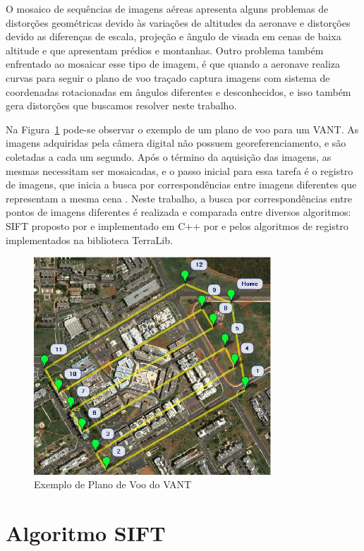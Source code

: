 \documentclass[9pt, a4paper, nofonttune, journal]{IEEEtran}
\begin{document}
O mosaico de sequências de imagens aéreas apresenta alguns problemas de distorções geométricas devido às variações de altitudes da aeronave e distorções devido as diferenças de escala, projeção e ângulo de visada em cenas de baixa altitude e que apresentam prédios e montanhas. Outro problema também enfrentado ao mosaicar esse tipo de imagem, é que quando a aeronave realiza curvas para seguir o plano de voo traçado captura imagens com sistema de coordenadas rotacionadas em ângulos diferentes e desconhecidos, e isso também gera distorções que buscamos resolver neste trabalho.

Na Figura~\ref{fig:plano_voo} pode-se observar o exemplo de um plano de voo para um VANT. As imagens adquiridas pela câmera digital não possuem georeferenciamento, e são coletadas a cada um segundo. Após o término da aquisição das imagens, as mesmas necessitam ser mosaicadas, e o passo inicial para essa tarefa é o registro de imagens, que inicia a busca por correspondências entre imagens diferentes que representam a mesma cena \cite{goltz1}. Neste trabalho, a busca por correspondências entre pontos de imagens diferentes é realizada e comparada entre diversos algoritmos: SIFT proposto por \cite{lowe} e implementado em C++ por \cite{vedaldi} e pelos algoritmos de registro implementados na biblioteca TerraLib.

\begin{figure}[h!t]
  \centering
  \includegraphics[width=3.5in]{figuras/plano_voo}
  \caption{Exemplo de Plano de Voo do VANT}
  \label{fig:plano_voo}
\end{figure}

\section{Algoritmo SIFT}
\end{document}
